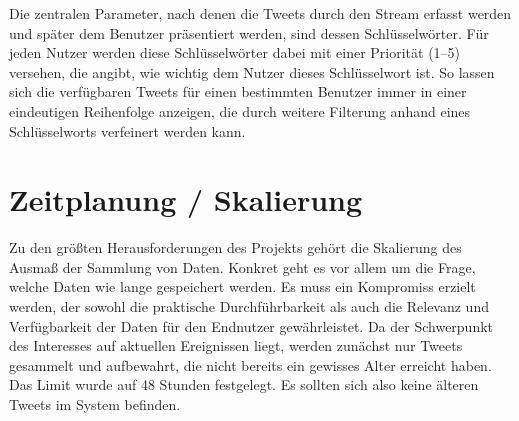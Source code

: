 Die zentralen Parameter, nach denen die Tweets durch den Stream erfasst werden und später dem
Benutzer präsentiert werden, sind dessen Schlüsselwörter. Für jeden Nutzer werden diese
Schlüsselwörter dabei mit einer Priorität (1–5) versehen, die angibt, wie wichtig dem Nutzer dieses
Schlüsselwort ist. So lassen sich die verfügbaren Tweets für einen bestimmten Benutzer immer in
einer eindeutigen Reihenfolge anzeigen, die durch weitere Filterung anhand eines Schlüsselworts
verfeinert werden kann.

\section{Zeitplanung / Skalierung}

Zu den größten Herausforderungen des Projekts gehört die Skalierung des Ausmaß der Sammlung
von Daten. Konkret geht es vor allem um die Frage, welche Daten wie lange gespeichert werden.
Es muss ein Kompromiss erzielt werden, der sowohl die praktische Durchführbarkeit als auch die
Relevanz und Verfügbarkeit der Daten für den Endnutzer gewährleistet. Da der Schwerpunkt des
Interesses auf aktuellen Ereignissen liegt, werden zunächst nur Tweets gesammelt und aufbewahrt,
die nicht bereits ein gewisses Alter erreicht haben. Das Limit wurde auf 48 Stunden festgelegt. Es
sollten sich also keine älteren Tweets im System befinden.